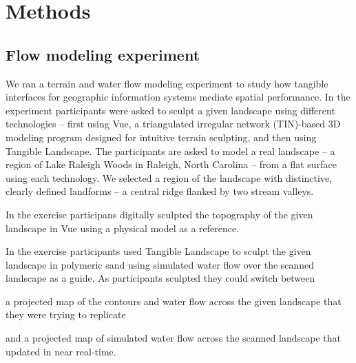 \documentclass{isprs}
\begin{document}
\section{Methods}\label{sec:methods}




\subsection{Flow modeling experiment}


We ran a terrain and water flow modeling experiment to study how tangible interfaces for geographic information systems mediate spatial performance. 
%
In the experiment participants were asked to sculpt a given landscape using different technologies -- 
first using Vue, a triangulated irregular network (TIN)-based 3D modeling program designed for intuitive terrain sculpting, 
and then using Tangible Landscape. 
%
The participants are asked to model a real landscape --
a region of Lake Raleigh Woods 
in Raleigh, North Carolina  -- 
from a flat surface using each technology. 
We selected a region of the landscape with distinctive, 
clearly defined landforms -- a central ridge flanked by two stream valleys. 




In the  exercise 
participans digitally sculpted the topography of the given landscape in Vue
using a physical model as a reference. 

In the  exercise participants used Tangible Landscape to 
sculpt the given landscape in polymeric sand 
using
simulated water flow 
over the scanned landscape
as a guide. 
%
As participants sculpted they could switch between 
\begin{enumerate*}%
\item a projected map of the contours and water flow across the given landscape that they were trying to replicate
\item and a projected map of simulated water flow across the scanned landscape that updated in near real-time.
\end{enumerate*}
\end{document}
